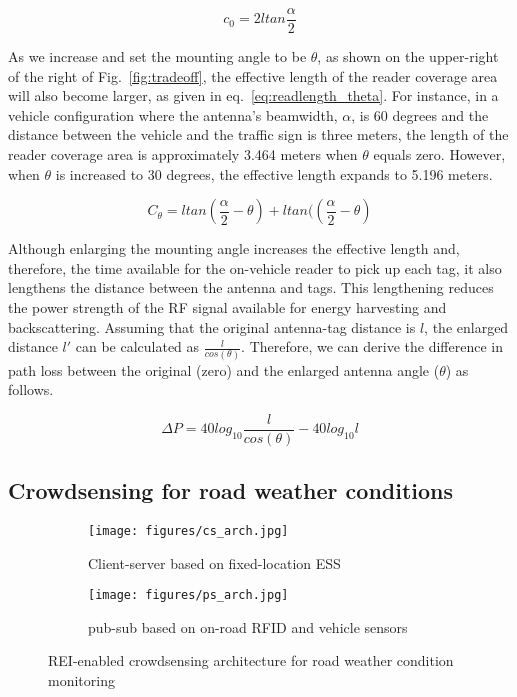 \documentclass[lettersize,journal]{IEEEtran}
\begin{document}
\begin{equation}\label{eq:readlength_zero}
    c_0=2ltan\frac{\alpha}{2}
\end{equation}

As we increase and set the mounting angle to be $\theta$, as shown on the upper-right of the right of Fig.~\ref{fig:tradeoff}, the effective length of the reader coverage area will also become larger, as given in eq.~\ref{eq:readlength_theta}. For instance, in a vehicle configuration where the antenna's beamwidth, $\alpha$, is 60 degrees and the distance between the vehicle and the traffic sign is three meters, the length of the reader coverage area is approximately 3.464 meters when $\theta$ equals zero. However, when $\theta$ is increased to 30 degrees, the effective length expands to 5.196 meters.

\begin{equation}\label{eq:readlength_theta}
    C_{\theta} = ltan(\frac{\alpha}{2}-\theta) + ltan((\frac{\alpha}{2}-\theta)
\end{equation}

Although enlarging the mounting angle increases the effective length and, therefore, the time available for the on-vehicle reader to pick up each tag, it also lengthens the distance between the antenna and tags. This lengthening reduces the power strength of the RF signal available for energy harvesting and backscattering. Assuming that the original antenna-tag distance is $l$, the enlarged distance $l'$ can be calculated as $\frac{l}{cos(\theta)}$. Therefore, we can derive the difference in path loss between the original (zero) and the enlarged antenna angle ($\theta$) as follows.

\begin{equation}\label{eq:enlarged_dist}
    \Delta P = 40log_{10}\frac{l}{cos(\theta)} - 40log_{10}l
\end{equation}

\subsection{Crowdsensing for road weather conditions}

\begin{figure*}[tb!]
\centering
\begin{subfigure}{0.35\textwidth}
  \centering
  \texttt{[image: figures/cs\_arch.jpg]}
  \caption{Client-server based on fixed-location ESS}
  \label{fig:cs_arch}
\end{subfigure}
\begin{subfigure}{0.4\textwidth}
  \centering
  \texttt{[image: figures/ps\_arch.jpg]}
  \caption{pub-sub based on on-road RFID and vehicle sensors}
  \label{fig:ps_arch}
\end{subfigure}
\caption{REI-enabled crowdsensing architecture for road weather condition monitoring}
\label{fig:sensing_arch}
\end{figure*}
\end{document}
